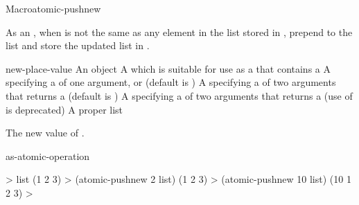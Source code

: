 \documentclass[10pt,twoside,english,pdftex]{article}
\begin{document}
\begin{functiondoc}{Macro}{atomic-pushnew}{ 
    }
%

\fnsyntax

\fnpurpose As an , when  is not
the same as any element in the list stored in , prepend
 to the list and store the updated list in .

\fnpackage {}

\fnmodule {}

\fnargs
\begin{args}{new-place-value}
\arg[item] An object
\arg[place] A  which is suitable for use as a
 that contains a  
\arg[key] A  specifying a 
of one argument, or \nil{} (default is \nil)
\arg[test] A  specifying a 
of two arguments that returns a  (default is
)
 A  specifying a
 of two arguments that returns a
 (use of  is deprecated)
 A proper list
\end{args}

\fnreturns The new value of . 

\begin{alsos}{as-atomic-operation}
\end{alsos}

\fnexamples
%
\W\supp
\begin{example}
  > list
  (1 2 3)
  > (atomic-pushnew 2 list)
  (1 2 3)
  > (atomic-pushnew 10 list)
  (10 1 2 3)
  >
\end{example}

\end{functiondoc}

\end{document}
